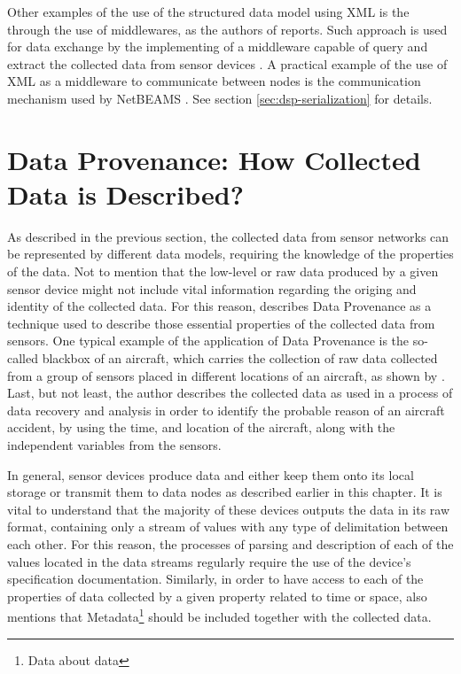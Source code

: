 Other examples of the use of the structured data model using XML is the through
the use of middlewares, as the authors of \cite{sn-xml-query-engines} reports.
Such approach is used for data exchange by the implementing of a middleware
capable of query and extract the collected data from sensor devices
\cite{sn-xml-middleware}. A practical example of the use of XML as a middleware
to communicate between nodes is the communication mechanism used by NetBEAMS
\cite{netbeams2009}. See section \ref{sec:dsp-serialization} for details.

\section{Data Provenance: How Collected Data is Described?}
\label{sec:sn-provenance}

As described in the previous section, the collected data from sensor networks
can be represented by different data models, requiring the knowledge of the
properties of the data. Not to mention that the low-level or raw data produced
by a given sensor device might not include vital information regarding the
origing and identity of the collected data. For this reason,
\cite{sn-provenance} describes Data Provenance as a technique used to describe
those essential properties of the collected data from sensors. One typical
example of the application of Data Provenance is the so-called blackbox of an
aircraft, which carries the collection of raw data collected from a group of
sensors placed in different locations of an aircraft, as shown by
\cite{sn-exemple-blackbox}. Last, but not least, the author describes the
collected data as used in a process of data recovery and analysis in order to
identify the probable reason of an aircraft accident, by using the time, and
location of the aircraft, along with the independent variables from the
sensors.

In general, sensor devices produce data and either keep them onto its local
storage or transmit them to data nodes as described earlier in this chapter. It
is vital to understand that the majority of these devices outputs the data in
its raw format, containing only a stream of values with any type of
delimitation between each other. For this reason, the processes of parsing and
description of each of the values located in the data streams regularly require
the use of the device's specification documentation. Similarly, in order to
have access to each of the properties of data collected by a given property
related to time or space, \cite{sn-provenance} also mentions that 
Metadata\footnote{Data about data} should be included together with the
collected data.

